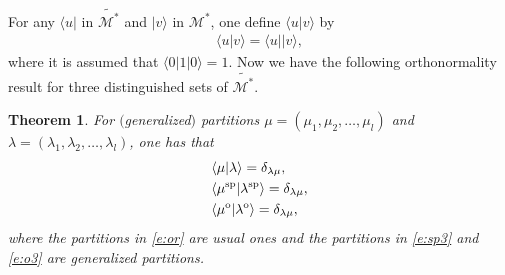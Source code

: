 \documentclass[10pt,a4paper]{amsart}
\numberwithin{equation}{section}
\newtheorem{Theorem}{Theorem}[section]
\begin{document}
For any $\langle u|$ in $\widetilde{\mathcal{M}^*}$ and $|v\rangle$ in $\mathcal{M}^*$, one define $\langle u|v\rangle$ by
 \begin{align*}
 \langle u|v\rangle=\langle u||v\rangle,
 \end{align*}
 where it is assumed that $\langle 0|1|0\rangle=1$. Now we have the following orthonormality result for three distinguished sets of $\widetilde{\mathcal{M}^*}$.
\begin{Theorem}\label{th2}
For $($generalized$)$ partitions $\mu=(\mu_1,\mu_2,\dots,\mu_l)$ and $\lambda=(\lambda_1,\lambda_2,\dots,\lambda_l)$, one has that
\begin{align}
\label{e:or}&\langle \mu|\lambda\rangle=\delta_{\lambda\mu},\\
\label{e:sp3}&\langle \mu^{\rm sp}|\lambda^{\rm sp}\rangle=\delta_{\lambda\mu},\\
\label{e:o3}&\langle \mu^{\rm o}|\lambda^{\rm o}\rangle=\delta_{\lambda\mu},
\end{align}
where the partitions in \eqref{e:or} are usual ones and the partitions in \eqref{e:sp3} and \eqref{e:o3} are
generalized partitions.
\end{Theorem}
\end{document}
